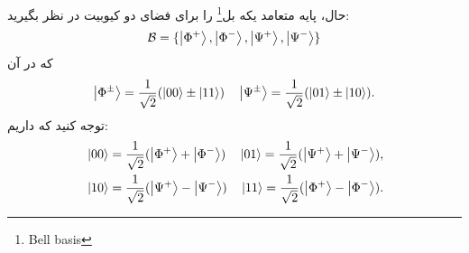 حال، پایه متعامد یکه بل\footnote{Bell basis} را برای فضای دو کیوبیت در نظر بگیرید: 
\begin{equation}
	\mathcal{B} = \{ \ket{\Phi^{+}}, \ket{\Phi^{-}}, \ket{\Psi^{+}}, \ket{\Psi^{-}} \}
\end{equation}
که در آن 
\begin{equation}
	\ket{\Phi^{\pm}} = \frac{1}{\sqrt{2}} (\ket{00} \pm \ket{11} ) \quad \ket{\Psi^{\pm}} = \frac{1}{\sqrt{2}} (\ket{01} \pm \ket{10} ).
\end{equation}
توجه کنید که داریم: 
\begin{equation}
\begin{split}
	&\ket{00} = \frac{1}{\sqrt{2}} (\ket{\Phi^{+}} + \ket{\Phi^{-}} ) \quad \ket{01} = \frac{1}{\sqrt{2}} (\ket{\Psi^{+}} + \ket{\Psi^{-}} ),\\
	&\ket{10} = \frac{1}{\sqrt{2}} (\ket{\Psi^{+}} - \ket{\Psi^{-}} ) \quad \ket{11} = \frac{1}{\sqrt{2}} (\ket{\Phi^{+}} - \ket{\Phi^{-}} ).
	\end{split}
\end{equation}

